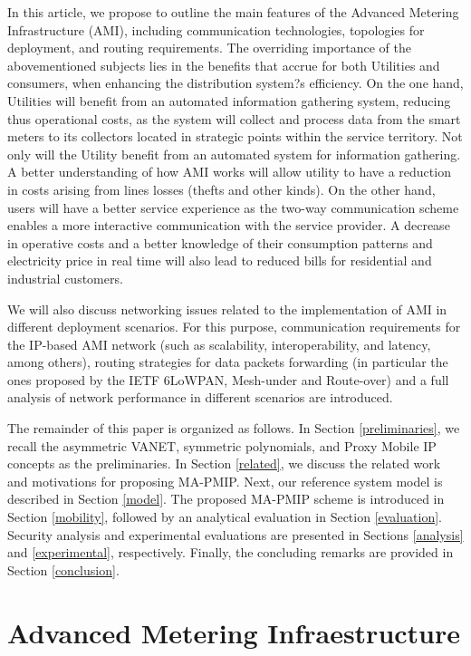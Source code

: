 \documentclass[11pt,draftclsnofoot,onecolumn]{IEEEtran}
\begin{document}
In this article, we propose to outline the main features of the Advanced Metering Infrastructure (AMI), including communication technologies, topologies for deployment, and routing requirements. The overriding importance of the abovementioned subjects lies in the benefits that accrue for both Utilities and consumers, when enhancing the distribution system?s efficiency. On the one hand, Utilities will benefit from an automated information gathering system, reducing thus operational costs, as the system will collect and process data from the smart meters to its collectors located in strategic points within the service territory. Not only will the Utility benefit from an automated system for information gathering. A better understanding of how AMI works will allow utility to have a reduction in costs arising from lines losses (thefts and other kinds). On the other hand, users will have a better service experience as the two-way communication scheme enables a more interactive communication with the service provider. A decrease in operative costs and a better knowledge of their consumption patterns and electricity price in real time will also lead to reduced bills for residential and industrial customers. 

We will also discuss networking issues related to the implementation of AMI in different deployment scenarios. For this purpose, communication requirements for the IP-based AMI network (such as scalability, interoperability, and latency, among others), routing strategies for data packets forwarding (in particular the ones proposed by the IETF 6LoWPAN, Mesh-under and Route-over) and a full analysis of network performance in different scenarios are introduced. 


The remainder of this paper is organized as follows. In Section \ref{preliminaries}, we recall the asymmetric VANET, symmetric polynomials, and Proxy Mobile IP concepts as the preliminaries. In Section  \ref{related}, we discuss the related work and motivations for proposing MA-PMIP. Next, our reference system model is described in Section \ref{model}. The proposed MA-PMIP scheme is introduced in Section \ref{mobility}, followed by an analytical evaluation in Section \ref{evaluation}. Security analysis and experimental evaluations are presented in Sections \ref{analysis} and \ref{experimental}, respectively. Finally, the concluding remarks are provided in Section \ref{conclusion}.

\section{Advanced Metering Infraestructure}\label{ami}
\end{document}
